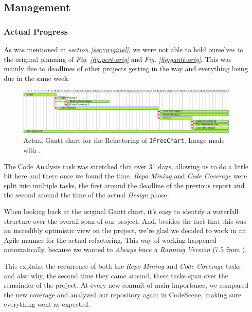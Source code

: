 \documentclass[11pt]{article}
\begin{document}
	\subsection{Management}
	\label{sec:management2}
	\subsubsection{Actual Progress}
	As was mentioned in \textsl{section \ref{sec:original}}, we were not able to hold ourselves to the original planning of \textsl{Fig. \ref{fig:pert-orig}} and \textsl{Fig. \ref{fig:gantt-orig}}. This was mainly due to deadlines of other projects getting in the way and everything being due in the same week.
	
	\begin{figure}[H] 
		\centering 
		\includegraphics[width=\textwidth]{pictures/gantt-actual.pdf}
		\caption{Actual \textsf{Gantt} chart for the Refactoring of \texttt{JFreeChart}. Image made with \cite{plantuml}.} 
		\label{fig:gantt-actual} 
	\end{figure}

	The \textsf{Code Analysis} task was stretched thin over 31 days, allowing us to do a little bit here and there once we found the time. \textsl{Repo Mining} and \textsl{Code Coverage} were split into multiple tasks, the first around the deadline of the previous report and the second around the time of the actual \textsl{Design} phase.
	
	When looking back at the original \textsf{Gantt} chart, it's easy to identify a waterfall structure over the overall span of our project. And, besides the fact that this was an incredibly optimistic view on the project, we're glad we decided to work in an \textsf{Agile} manner for the actual refactoring. This way of working happened automatically, because we wanted to \textsl{Always have a Running Version} (7.5 from \cite{demeyer2009object}).
	
	This explains the recurrence of both the \textsl{Repo Mining} and \textsl{Code Coverage} tasks and also why, the second time they came around, these tasks span over the remainder of the project. At every new commit of main importance, we compared the new coverage and analyzed our repository again in \textsf{CodeScene}, making sure everything went as expected.
	
\end{document}
